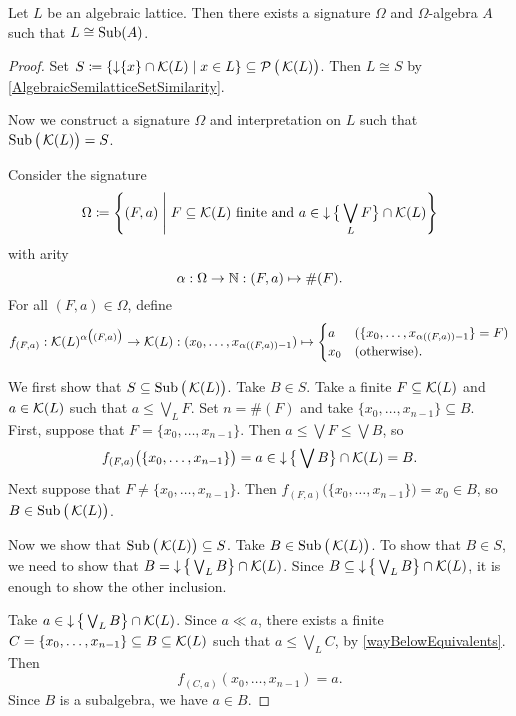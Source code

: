 \begin{theorem}
Let $L$ be an algebraic lattice. Then there exists a signature $\Omega$ and $\Omega$-algebra $A$ such that $L\cong \operatorname{Sub}(A)$.
\end{theorem}
\begin{proof}
Set $S \defeq \setbuilder{\downset\{x\}\cap \compacts(L)}{x\in L}\subseteq \powerset\big(\compacts(L)\big)$. Then $L\cong S$ by \ref{AlgebraicSemilatticeSetSimilarity}.

Now we construct a signature $\Omega$ and interpretation on $L$ such that $\operatorname{Sub}\big(\operatorname{\mathcal{K}}(L)\big) = S$.

Consider the signature
\[ \Omega \defeq \setbuilder{(F,a)}{\text{$F\subseteq \compacts(L)$ finite and $a\in \downset\big\{\bigvee_L F\big\} \cap \compacts(L)$}} \]
with arity
\[ \alpha: \Omega\to \mathbb{N}: (F,a) \mapsto \#(F). \]
For all $(F,a)\in \Omega$, define
\[ f_{(F,a)}: \operatorname{\mathcal{K}}(L)^{\alpha\big((F,a)\big)} \to \operatorname{\mathcal{K}}(L): (x_0, \ldots, x_{\alpha((F,a))-1}) \mapsto \begin{cases}
a & (\{x_0, \ldots, x_{\alpha((F,a))-1}\} = F) \\
x_0 & (\text{otherwise}).
\end{cases} \]

We first show that $S\subseteq \operatorname{Sub}\big(\operatorname{\mathcal{K}}(L)\big)$. Take $B\in S$. Take a finite $F\subseteq \operatorname{\mathcal{K}}(L)$ and $a\in \operatorname{\mathcal{K}}(L)$ such that $a\leq \bigvee_L F$. Set $n = \#(F)$ and take $\{x_0, \ldots, x_{n-1}\}\subseteq B$. First, suppose that $F = \{x_0, \ldots, x_{n-1}\}$. Then $a\leq \bigvee F \leq \bigvee B$, so
\[ f_{(F,a)}\big(\{x_0, \ldots, x_{n-1}\}\big) = a\in \operatorname{\downarrow} \big\{\bigvee B\big\}\cap \operatorname{\mathcal{K}}(L) = B. \]
Next suppose that $F \neq \{x_0, \ldots, x_{n-1}\}$. Then $f_{(F,a)}\big(\{x_0, \ldots, x_{n-1}\}\big) = x_0 \in B$, so $B\in \operatorname{Sub}\big(\operatorname{\mathcal{K}}(L)\big)$.

Now we show that $\operatorname{Sub}\big(\operatorname{\mathcal{K}}(L)\big) \subseteq S$. Take $B\in \operatorname{Sub}\big(\operatorname{\mathcal{K}}(L)\big)$. To show that $B\in S$, we need to show that $B = \operatorname{\downarrow} \big\{\bigvee_L B\big\} \cap \operatorname{\mathcal{K}}(L)$. Since $B\subseteq \operatorname{\downarrow} \big\{\bigvee_L B\big\} \cap \operatorname{\mathcal{K}}(L)$, it is enough to show the other inclusion.

Take $a\in \operatorname{\downarrow} \big\{\bigvee_L B\big\} \cap \operatorname{\mathcal{K}}(L)$. Since $a\ll a$, there exists a finite $C = \{x_0, \ldots, x_{n-1}\}\subseteq B\subseteq \operatorname{\mathcal{K}}(L)$ such that $a\leq \bigvee_L C$, by \ref{wayBelowEquivalents}.
Then
\[ f_{(C,a)}(x_0, \ldots, x_{n-1}) = a. \]
Since $B$ is a subalgebra, we have $a\in B$.
\end{proof}



